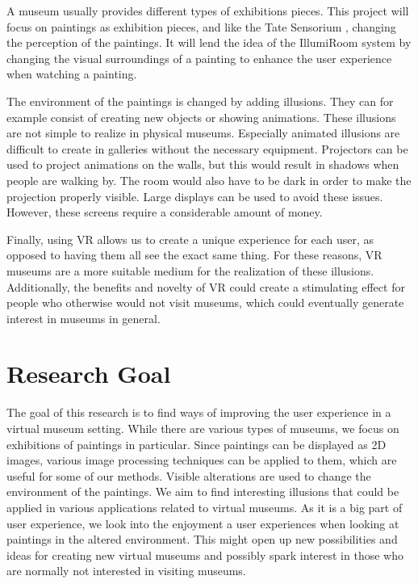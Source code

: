 \documentclass[a4paper]{article}
\begin{document}
A museum usually provides different types of exhibitions pieces. This project will focus on paintings as exhibition pieces, and like the Tate Sensorium \cite{tate2}, changing the perception of the paintings. It will lend the idea of the IllumiRoom system \cite{illumiroom} by changing the visual surroundings of a painting to enhance the user experience when watching a painting. 



The environment of the paintings is changed by adding illusions. They can for example consist of creating new objects or showing animations. These illusions are not simple to realize in physical museums. Especially animated illusions are difficult to create in galleries without the necessary equipment. Projectors can be used to project animations on the walls, but this would result in shadows when people are walking by. The room would also have to be dark in order to make the projection properly visible. Large displays can be used to avoid these issues. However, these screens require a considerable amount of money. 

Finally, using VR allows us to create a unique experience for each user, as opposed to having them all see the exact same thing. For these reasons, VR museums are a more suitable medium for the realization of these illusions. Additionally, the benefits and novelty of VR could create a stimulating effect for people who otherwise would not visit museums, which could eventually generate interest in museums in general.

\section{Research Goal}
The goal of this research is to find ways of improving the user experience in a virtual museum setting. While there are various types of museums, we focus on exhibitions of paintings in particular. Since paintings can be displayed as 2D images, various image processing techniques can be applied to them, which are useful for some of our methods. Visible alterations are used to change the environment of the paintings. We aim to find interesting illusions that could be applied in various applications related to virtual museums. As it is a big part of user experience, we look into the enjoyment a user experiences when looking at paintings in the altered environment. This might open up new possibilities and ideas for creating new virtual museums and possibly spark interest in those who are normally not interested in visiting museums.
\end{document}

